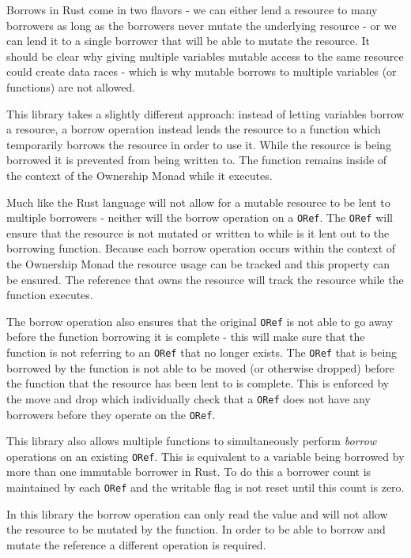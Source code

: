 \documentclass[onehalf,11pt]{beavtex}
\begin{document}
Borrows in Rust come in two flavors - we can either lend a resource to many
borrowers as long as the borrowers never mutate the underlying resource - or we
can lend it to a single borrower that will be able to mutate the
resource.\cite{rust_book_borrowing}
It should be clear why giving multiple variables mutable access to
the same resource could create data races - which is why mutable borrows to
multiple variables (or functions) are not allowed.

This library takes a slightly different approach: instead of letting variables
borrow a resource, a borrow operation instead lends the resource to a function
which temporarily borrows the resource in order to use it.  While the resource
is being borrowed it is prevented from being written to. The function remains
inside of the context of the Ownership Monad while it executes.

Much like the Rust language will not allow for a mutable resource to be lent to
multiple borrowers - neither will the borrow operation on a \texttt{ORef}.
The \texttt{ORef} will ensure that the resource is not mutated or written to while is it
lent out to the borrowing function. 
Because each borrow operation occurs within the context of the Ownership Monad
the resource usage can be tracked and this property can be ensured. The
reference that owns the resource will track the resource while the function
executes.

The borrow operation also ensures that the original \texttt{ORef} is not able to go away
before the function borrowing it is complete - this will make sure that the
function is not referring to an \texttt{ORef} that no longer exists.  The \texttt{ORef} that is
being borrowed by the function is not able to be moved (or otherwise dropped)
before the function that the resource has been lent to is complete. This is
enforced by the move and drop which individually check that
a \texttt{ORef} does not have any borrowers before they operate on the \texttt{ORef}.

This library also allows multiple functions to simultaneously perform
\textit{borrow} operations on an existing \texttt{ORef}. This is equivalent to a variable
being borrowed by more than one immutable borrower in Rust. To do this a
borrower count is maintained by each \texttt{ORef} and the writable flag is not
reset until this count is zero.

In this library the borrow operation can only read the value and will not allow
the resource to be mutated by the function.  In order to be able to borrow and
mutate the reference a different operation is required.
\end{document}
